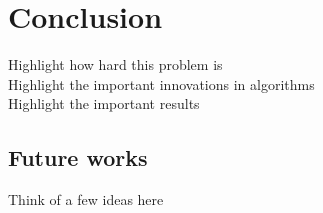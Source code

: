 \documentclass{report}
\begin{document}
\chapter{Conclusion}
Highlight how hard this problem is \\
Highlight the important innovations in algorithms \\
Highlight the important results \\

\section{Future works}
Think of a few ideas here



\printbibliography
\end{document}
